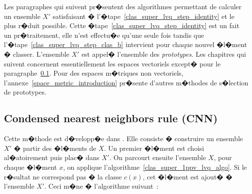 
Les paragraphes qui suivent pr�sentent des algorithmes permettant de calculer un ensemble $X'$ satisfaisant � l'�tape~\ref{clas_super_lvq_step_identity} et le plus r�duit possible. Cette �tape~\ref{clas_super_lvq_step_identity} est un fait un pr�traitement, elle n'est effectu�e qu'une seule fois tandis que l'�tape~\ref{clas_super_lvq_step_clas_b} intervient pour chaque nouvel �l�ment � classer. L'ensemble $X'$ est appel� l'ensemble des \emph{prototypes}. Les chapitres qui suivent concernent essentiellement les espaces vectoriels except� pour le paragraphe~\ref{clas_super_lvq_cnn}. Pour des espaces m�triques non vectoriels, l'annexe~\ref{space_metric_introduction} pr�sente d'autres m�thodes de s�lection de prototypes.







\subsection{Condensed nearest neighbors rule (CNN)}
\label{clas_super_lvq_cnn}

Cette m�thode est d�velopp�e dans . Elle consiste � construire un ensemble $X'$ � partir des �l�ments de $X$. Un premier �l�ment est choisi al�atoirement puis plac� dans $X'$. On parcourt ensuite l'ensemble $X$, pour chaque �l�ment $x$, on applique l'algorithme~\ref{clas_super_1ppv_lvq_algo}. Si le r�sultat ne correspond pas � la classe $c(x)$, cet �l�ment est ajout� � l'ensemble $X'$. Ceci m�ne � l'algorithme suivant~:

